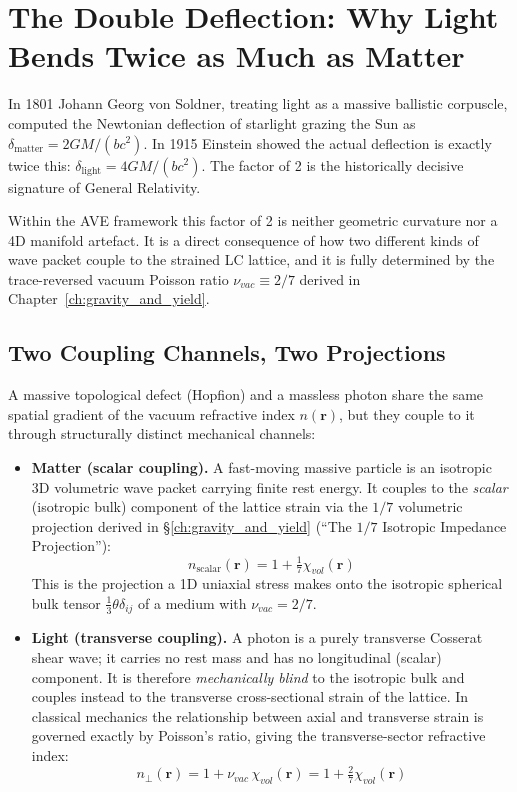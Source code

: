 \section{The Double Deflection: Why Light Bends Twice as Much as Matter}
\label{sec:double_deflection}

In 1801 Johann Georg von Soldner, treating light as a massive ballistic corpuscle, computed the Newtonian deflection of starlight grazing the Sun as $\delta_{\text{matter}} = 2GM/(bc^2)$. In 1915 Einstein showed the actual deflection is exactly twice this: $\delta_{\text{light}} = 4GM/(bc^2)$. The factor of 2 is the historically decisive signature of General Relativity.

Within the AVE framework this factor of 2 is neither geometric curvature nor a 4D manifold artefact. It is a direct consequence of how two different kinds of wave packet couple to the strained LC lattice, and it is fully determined by the trace-reversed vacuum Poisson ratio $\nu_{vac} \equiv 2/7$ derived in Chapter~\ref{ch:gravity_and_yield}.

\subsection{Two Coupling Channels, Two Projections}

A massive topological defect (Hopfion) and a massless photon share the same spatial gradient of the vacuum refractive index $n(\mathbf{r})$, but they couple to it through structurally distinct mechanical channels:

\begin{itemize}
    \item \textbf{Matter (scalar coupling).} A fast-moving massive particle is an isotropic 3D volumetric wave packet carrying finite rest energy. It couples to the \emph{scalar} (isotropic bulk) component of the lattice strain via the $1/7$ volumetric projection derived in \S\ref{ch:gravity_and_yield} (``The $1/7$ Isotropic Impedance Projection''):
    \begin{equation}
        n_{\text{scalar}}(\mathbf{r}) = 1 + \tfrac{1}{7}\chi_{vol}(\mathbf{r})
    \end{equation}
    This is the projection a 1D uniaxial stress makes onto the isotropic spherical bulk tensor $\tfrac{1}{3}\theta\delta_{ij}$ of a medium with $\nu_{vac} = 2/7$.

    \item \textbf{Light (transverse coupling).} A photon is a purely transverse Cosserat shear wave; it carries no rest mass and has no longitudinal (scalar) component. It is therefore \emph{mechanically blind} to the isotropic bulk and couples instead to the transverse cross-sectional strain of the lattice. In classical mechanics the relationship between axial and transverse strain is governed exactly by Poisson's ratio, giving the transverse-sector refractive index:
    \begin{equation}
        n_{\perp}(\mathbf{r}) = 1 + \nu_{vac}\,\chi_{vol}(\mathbf{r}) = 1 + \tfrac{2}{7}\chi_{vol}(\mathbf{r})
    \end{equation}
\end{itemize}

